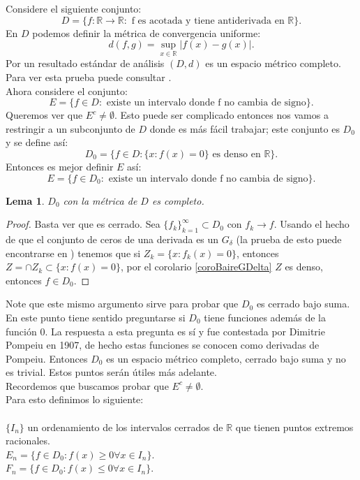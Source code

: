 \documentclass{article}
\newtheorem{lemma}[theorem]{Lema}
\theoremstyle{definition}
\newcommand{\suc}[4][\infty]{\{{#2_#3}\}_{#3=#4}^#1}
\newcommand{\R}{\mathbb{R}}
\begin{document}
Considere el siguiente conjunto:
$$
D=\{f:\R \rightarrow \R: \text{ f es acotada y tiene antiderivada en } \R \}.
$$
En $D$ podemos definir la métrica de convergencia uniforme:
$$
d(f,g)=\sup_{x\in \R} |f(x)-g(x)|.
$$
Por un resultado estándar de análisis $(D,d)$ es un espacio métrico completo. Para ver esta prueba puede consultar \cite{mathOnContUnifDer}. \\
Ahora considere el conjunto:
$$
E=\{f \in D:\text{ existe un intervalo donde f no cambia de signo}\}.
$$
Queremos ver que $E^c\neq \emptyset$. Esto puede ser complicado entonces nos vamos a restringir a un subconjunto de $D$ donde es más fácil trabajar; este conjunto es $D_0$ y se define así:\\
$$
D_0=\{f \in D: \{x: f(x)=0\} \text{ es denso en } \R \}.
$$
Entonces es mejor definir $E$ así:
$$
E=\{f \in D_0:\text{ existe un intervalo donde f no cambia de signo}\}.
$$

\begin{lemma}
$D_0$ con la métrica de $D$ es completo. 
\end{lemma}
\begin{proof}
Basta ver que es cerrado. Sea $\suc{f}{k}{1}\subset D_0$ con $f_k\rightarrow f$. Usando el hecho de que el conjunto de ceros de una derivada es un $G_\delta$ (la prueba de esto puede encontrarse en \cite{derivadaGDelta}) tenemos que si $Z_k=\{x:f_k(x)=0\}$, entonces $Z=\cap Z_k \subset \{x:f(x)=0\}$, por el corolario \ref{coroBaireGDelta} $Z$ es denso, entonces $f\in D_0$.
\end{proof}
Note que este mismo argumento sirve para probar que $D_0$ es cerrado bajo suma. En este punto tiene sentido preguntarse si $D_0$ tiene funciones además de la función $0$. La respuesta a esta pregunta es sí y fue contestada por Dimitrie Pompeiu en 1907, de hecho estas funciones se conocen como derivadas de Pompeiu. Entonces $D_0$ es un espacio métrico completo, cerrado bajo suma y no es trivial. Estos puntos serán útiles más adelante.\\
Recordemos que buscamos probar que $E^c\neq\emptyset$.\\
Para esto definimos lo siguiente:\\ \\
$\{I_n\}$ un ordenamiento de los intervalos cerrados de $\R$ que tienen puntos extremos racionales.\\
$E_n=\{f\in D_0: f(x)\geq0 \forall x\in I_n \}$.\\
$F_n=\{f\in D_0: f(x)\leq0 \forall x\in I_n \}$.
\end{document}
